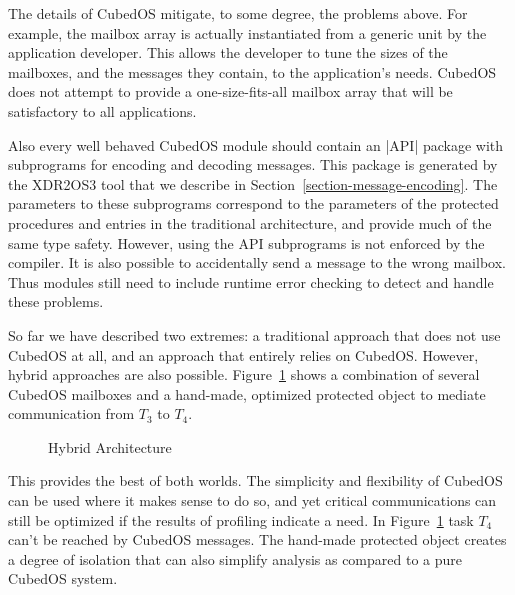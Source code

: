 The details of CubedOS mitigate, to some degree, the problems above. For example, the mailbox
array is actually instantiated from a generic unit by the application developer. This allows the
developer to tune the sizes of the mailboxes, and the messages they contain, to the
application's needs. CubedOS does not attempt to provide a one-size-fits-all mailbox array that
will be satisfactory to all applications.

Also every well behaved CubedOS module should contain an |API| package with subprograms for
encoding and decoding messages. This package is generated by the XDR2OS3 tool that we describe
in Section~\ref{section-message-encoding}. The parameters to these subprograms correspond to the
parameters of the protected procedures and entries in the traditional architecture, and provide
much of the same type safety. However, using the API subprograms is not enforced by the
compiler. It is also possible to accidentally send a message to the wrong mailbox. Thus modules
still need to include runtime error checking to detect and handle these problems.

So far we have described two extremes: a traditional approach that does not use CubedOS at all,
and an approach that entirely relies on CubedOS. However, hybrid approaches are also possible.
Figure~\ref{fig:hybrid-architecture} shows a combination of several CubedOS mailboxes and a
hand-made, optimized protected object to mediate communication from $T_3$ to $T_4$.

\begin{figure}[tbhp]
  \center
  \caption{Hybrid Architecture}
  \label{fig:hybrid-architecture}
\end{figure}

This provides the best of both worlds. The simplicity and flexibility of CubedOS can be used
where it makes sense to do so, and yet critical communications can still be optimized if the
results of profiling indicate a need. In Figure~\ref{fig:hybrid-architecture} task $T_4$ can't
be reached by CubedOS messages. The hand-made protected object creates a degree of isolation
that can also simplify analysis as compared to a pure CubedOS system.

